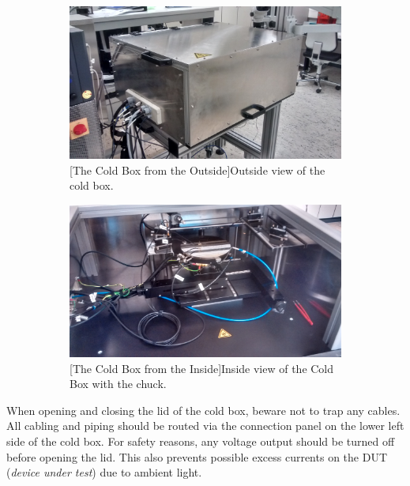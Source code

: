 \documentclass[a4paper]{article}
\begin{document}
\begin{figure}[hbtp]
\centering
\begin{subfigure}[t]{0.475\textwidth}
\centering\captionsetup{width=.8\linewidth}%
\includegraphics[width=\linewidth]{pictures/box.jpg}
[The Cold Box from the Outside]{Outside view of the cold box.}
\label{fig:outsidecoldbox}
\end{subfigure}
\begin{subfigure}[t]{0.475\textwidth}
\centering\captionsetup{width=.8\linewidth}%
\includegraphics[width=\linewidth]{pictures/inside_box.jpg}
[The Cold Box from the Inside]{Inside view of the Cold Box with the chuck.}
\label{fig:insidecoldbox}
\end{subfigure}
\end{figure}

When opening and closing the lid of the cold box, beware not to trap any cables.
All cabling and piping should be routed via the connection panel on the lower left side of the cold box.
For safety reasons, any voltage output should be turned off before opening the lid.
This also prevents possible excess currents on the DUT ({\it device under test}) due to ambient light.
\end{document}
